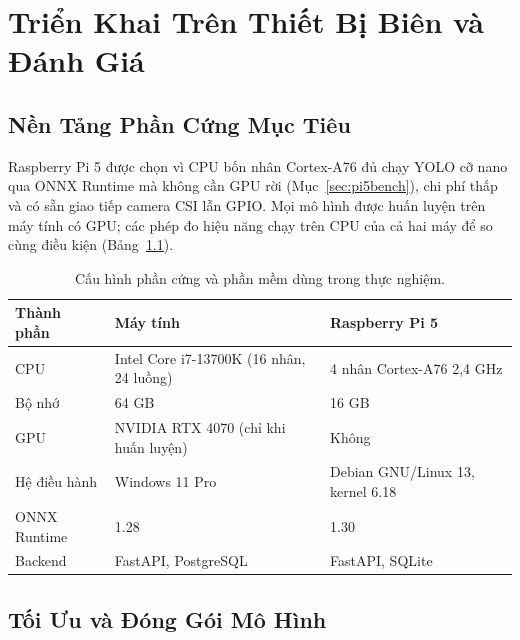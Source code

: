 \chapter{Triển Khai Trên Thiết Bị Biên và Đánh Giá}
\label{ch:trienkhai}

\section{Nền Tảng Phần Cứng Mục Tiêu}
\label{sec:trienkhai-phancung}

Raspberry Pi 5 được chọn vì CPU bốn nhân Cortex-A76 đủ chạy YOLO cỡ nano qua ONNX Runtime mà
không cần GPU rời (Mục~\ref{sec:pi5bench}), chi phí thấp và có sẵn giao tiếp camera CSI lẫn
GPIO. Mọi mô hình được huấn luyện trên máy tính có GPU; các phép đo hiệu năng chạy
trên CPU của cả hai máy để so cùng điều kiện (Bảng~\ref{tab:moi-truong}).

\begin{table}[htbp]
\centering
\caption{Cấu hình phần cứng và phần mềm dùng trong thực nghiệm.}
\label{tab:moi-truong}

\vspace{4pt}
\begin{tabular}{lll}
\toprule
\textbf{Thành phần} & \textbf{Máy tính} & \textbf{Raspberry Pi 5} \\
\midrule
CPU          & Intel Core i7-13700K (16 nhân, 24 luồng) & 4 nhân Cortex-A76 2,4 GHz \\
Bộ nhớ       & 64 GB & 16 GB \\
GPU          & NVIDIA RTX 4070 (chỉ khi huấn luyện) & Không \\
Hệ điều hành & Windows 11 Pro & Debian GNU/Linux 13, kernel 6.18 \\
ONNX Runtime & 1.28 & 1.30 \\
Backend      & FastAPI, PostgreSQL & FastAPI, SQLite \\
\bottomrule
\end{tabular}
\end{table}

\section{Tối Ưu và Đóng Gói Mô Hình}
\label{sec:trienkhai-toiuu}

